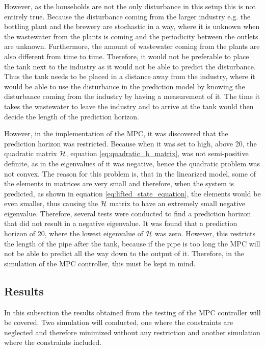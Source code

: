 However, as the households are not the only disturbance in this setup this is not entirely true. Because the disturbance coming from the larger industry e.g. the bottling plant and the brewery are stochastic in a way, where it is unknown when the wastewater from the plants is coming and the periodicity between the outlets are unknown. Furthermore, the amount of wastewater coming from the plants are also different from time to time. Therefore, it would not be preferable to place the tank next to the industry as it would not be able to predict the disturbance. Thus the tank needs to be placed in a distance away from the industry, where it would be able to use the disturbance in the prediction model by knowing the disturbance coming from the industry by having a measurement of it. The time it takes the wastewater to leave the industry and to arrive at the tank would then decide the length of the prediction horizon. 

However, in the implementation of the MPC, it was discovered that the prediction horizon was restricted. Because when it was set to high, above 20, the quadratic matrix $\CMcal{H}$, equation \ref{eq:quadratic_h_matrix}, was not semi-positive definite, as in the eigenvalues of it was negative, hence the quadratic problem was not convex. The reason for this problem is, that in the linearized model, some of the elements in matrices are very small and therefore, when the system is predicted, as shown in equation \ref{eq:lifted_state_equation}, the elements would be even smaller, thus causing the $\CMcal{H}$ matrix to have an extremely small negative eigenvalue. Therefore, several tests were conducted to find a prediction horizon that did not result in a negative eigenvalue. It was found that a prediction horizon of 20, where the lowest eigenvalue of $\CMcal{H}$ was zero. However, this restricts the length of the pipe after the tank, because if the pipe is too long the MPC will not be able to predict all the way down to the output of it. Therefore, in the simulation of the MPC controller, this must be kept in mind.   

\subsection*{Results}
In this subsection the results obtained from the testing of the MPC controller will be covered. Two simulation will conducted, one where the constraints are neglected and therefore minimized without any restriction and another simulation where the constraints included. 

